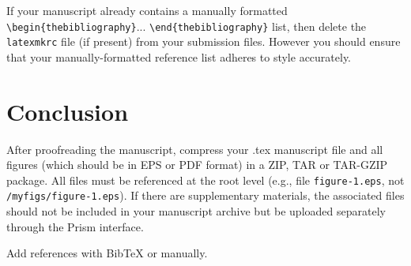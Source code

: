 \documentclass{optica-article}
\begin{document}
If your manuscript already contains a manually formatted
\verb|\begin{thebibliography}|... \verb|\end{thebibliography}| list, then
delete the \texttt{latexmkrc} file (if present) from your submission files.
However you should ensure that your manually-formatted reference list adheres
to style accurately.

\section{Conclusion}
After proofreading the manuscript, compress your .tex manuscript file and all
figures (which should be in EPS or PDF format) in a ZIP, TAR or TAR-GZIP package.
All files must be referenced at the root level (e.g., file \texttt{figure-1.eps},
not \texttt{/myfigs/figure-1.eps}). If there are supplementary materials, the
associated files should not be included in your manuscript archive but be
uploaded separately through the Prism interface.


Add references with BibTeX or manually.
\cite{Zhang:14,OPTICA,FORSTER2007,Dean2006,testthesis,Yelin:03,Masajada:13,codeexample}







\end{document}
